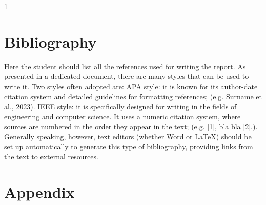 \documentclass[a4paper, oneside]{book}
\begin{document}



\tableofcontents



1

\chapter{Bibliography}

Here the student should list all the references used for writing the report. As presented in a dedicated document, there are many styles that can be used to write it. Two styles often adopted are:
APA style: it is known for its author-date citation system and detailed guidelines for formatting references; (e.g. Surname et al., 2023).
IEEE style: it is specifically designed for writing in the fields of engineering and computer science. It uses a numeric citation system, where sources are numbered in the order they appear in the text; (e.g. [1], bla bla [2].).
Generally speaking, however, text editors (whether Word or LaTeX) should be set up automatically to generate this type of bibliography, providing links from the text to external resources.


\chapter{Appendix}


\end{document}

